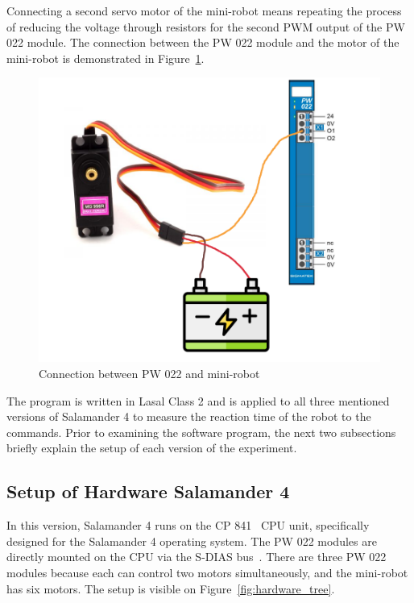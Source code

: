 \documentclass[MMR,Master,english]{twbook}
\begin{document}
\noindent Connecting a second servo motor of the mini-robot means repeating the process of reducing the voltage through resistors for the second PWM output of the PW 022 module. The connection between the PW 022 module and the motor of the mini-robot is demonstrated in Figure~\ref{fig:pw022_minirobot_connection}.

\begin{figure}[H]
	\centering
	\includegraphics[width=0.7\columnwidth]{img/experiment/pw022_minirobot.png}
	\caption[Connection between PW 022 and mini-robot]{Connection between PW 022 and mini-robot~\cite{MG996RDigitalServo}}
	\label{fig:pw022_minirobot_connection}
\end{figure}

\noindent The program is written in Lasal Class 2 and is applied to all three mentioned versions of Salamander 4 to measure the reaction time of the robot to the commands. Prior to examining the software program, the next two subsections briefly explain the setup of each version of the experiment.

\subsection{Setup of Hardware Salamander 4}
In this version, Salamander 4 runs on the CP 841~\cite{CPUUnitsSIGMATEK} CPU unit, specifically designed for the Salamander 4 operating system. The PW 022 modules are directly mounted on the CPU via the S-DIAS bus~\cite{SDIASSIGMATEK}. There are three PW 022 modules because each can control two motors simultaneously, and the mini-robot has six motors. The setup is visible on Figure~\ref{fig:hardware_tree}.
\end{document}
